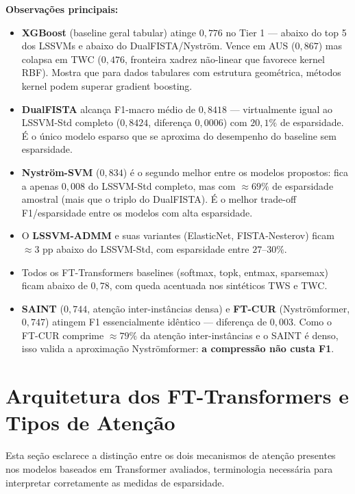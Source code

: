 \documentclass[12pt,a4paper]{article}
\begin{document}
\textbf{Observações principais:}
\begin{itemize}
  \item \textbf{XGBoost} (baseline geral tabular) atinge $0{,}776$ no Tier 1 ---
        abaixo do top 5 dos LSSVMs e abaixo do DualFISTA/Nyström. Vence em AUS
        ($0{,}867$) mas colapsa em TWC ($0{,}476$, fronteira xadrez não-linear que
        favorece kernel RBF). Mostra que para dados tabulares com estrutura
        geométrica, métodos kernel podem superar gradient boosting.
  \item \textbf{DualFISTA} alcança F1-macro médio de $0{,}8418$ ---
        virtualmente igual ao LSSVM-Std completo ($0{,}8424$, diferença $0{,}0006$)
        com $20{,}1\%$ de esparsidade. É o único modelo esparso que se aproxima
        do desempenho do baseline sem esparsidade.
  \item \textbf{Nyström-SVM} ($0{,}834$) é o segundo melhor entre os modelos
        propostos: fica a apenas $0{,}008$ do LSSVM-Std completo, mas com
        $\approx 69\%$ de esparsidade amostral (mais que o triplo do DualFISTA).
        É o melhor trade-off F1/esparsidade entre os modelos com alta esparsidade.
  \item O \textbf{LSSVM-ADMM} e suas variantes (ElasticNet, FISTA-Nesterov)
        ficam $\approx 3$ pp abaixo do LSSVM-Std, com esparsidade entre $27$--$30\%$.
  \item Todos os FT-Transformers baselines (softmax, topk, entmax, sparsemax)
        ficam abaixo de $0{,}78$, com queda acentuada nos sintéticos TWS e TWC.
  \item \textbf{SAINT} ($0{,}744$, atenção inter-instâncias densa) e
        \textbf{FT-CUR} (Nyströmformer, $0{,}747$) atingem F1 essencialmente
        idêntico --- diferença de $0{,}003$. Como o FT-CUR comprime $\approx 79\%$
        da atenção inter-instâncias e o SAINT é denso, isso valida a aproximação
        Nyströmformer: \textbf{a compressão não custa F1}.
\end{itemize}

\section{Arquitetura dos FT-Transformers e Tipos de Atenção}
\label{sec:ft_attention}

Esta seção esclarece a distinção entre os dois mecanismos de atenção presentes
nos modelos baseados em Transformer avaliados, terminologia necessária para
interpretar corretamente as medidas de esparsidade.
\end{document}
